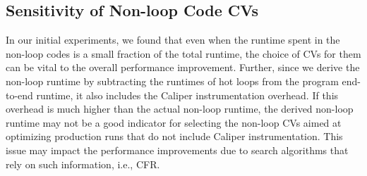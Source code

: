 \subsection{Sensitivity of Non-loop Code CVs}\label{cv sensitivity}

In our initial experiments, we found that even when the runtime spent in the
non-loop codes is a small fraction of the total runtime,
the choice of CVs for them can be vital to the overall performance
improvement.
Further, since we derive the non-loop runtime by subtracting the
runtimes of hot loops from the program end-to-end runtime, it also
includes the Caliper instrumentation overhead.  If this overhead is
much higher than the actual non-loop runtime, the derived non-loop
runtime may not be a good indicator for selecting the non-loop CVs
aimed at optimizing production runs that do not include Caliper
instrumentation. This issue may impact the performance improvements due to search
algorithms that rely on such information, i.e., CFR.


